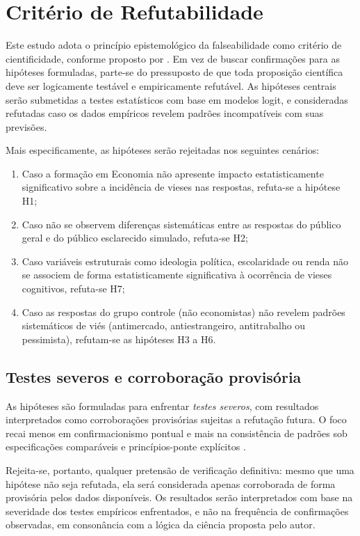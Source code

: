 \section{Critério de Refutabilidade}

Este estudo adota o princípio epistemológico da falseabilidade como critério de cientificidade, conforme proposto por . Em vez de buscar confirmações para as hipóteses formuladas, parte-se do pressuposto de que toda proposição científica deve ser logicamente testável e empiricamente refutável. As hipóteses centrais serão submetidas a testes estatísticos com base em modelos logit, e consideradas refutadas caso os dados empíricos revelem padrões incompatíveis com suas previsões.

Mais especificamente, as hipóteses serão rejeitadas nos seguintes cenários:

\begin{enumerate}[label=\alph*)]

    \item Caso a formação em Economia não apresente impacto estatisticamente significativo sobre a incidência de vieses nas respostas, refuta-se a hipótese H1;
    \item Caso não se observem diferenças sistemáticas entre as respostas do público geral e do público esclarecido simulado, refuta-se H2;
    \item Caso variáveis estruturais como ideologia política, escolaridade ou renda não se associem de forma estatisticamente significativa à ocorrência de vieses cognitivos, refuta-se H7;
    \item Caso as respostas do grupo controle (não economistas) não revelem padrões sistemáticos de viés (antimercado, antiestrangeiro, antitrabalho ou pessimista), refutam-se as hipóteses H3 a H6.
    
\end{enumerate}

\subsection{Testes severos e corroboração provisória}
As hipóteses são formuladas para enfrentar \textit{testes severos}, com resultados interpretados como corroborações provisórias sujeitas a refutação futura. O foco recai menos em confirmacionismo pontual e mais na consistência de padrões sob especificações comparáveis e princípios-ponte explícitos \cite{hausman2008,stigum2003}.

Rejeita-se, portanto, qualquer pretensão de verificação definitiva: mesmo que uma hipótese não seja refutada, ela será considerada apenas corroborada de forma provisória pelos dados disponíveis. Os resultados serão interpretados com base na severidade dos testes empíricos enfrentados, e não na frequência de confirmações observadas, em consonância com a lógica da ciência proposta pelo autor.

